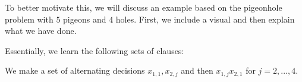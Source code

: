 To better motivate this, we will discuss an example based on the pigeonhole problem with $5$ pigeons and $4$ holes. First, we include a visual and then explain what we have done.


Essentially, we learn the following sets of clauses:

We make a set of alternating decisions $x_{1, 1}, x_{2, j}$ and then $x_{1, j} x_{2, 1}$  for $j = 2, ..., 4$.

